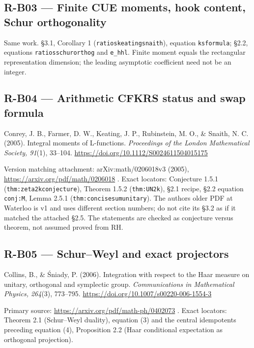\documentclass[11pt,a4paper]{article}
\theoremstyle{definition}\newtheorem{definition}{Definition}
\begin{document}
\subsection{R-B03 --- Finite CUE moments, hook content, Schur
orthogonality}\label{r-b03--finite-cue-moments-hook-content-schur-orthogonality}

Same work. §3.1, Corollary 1 (\texttt{ratioskeatingsnaith}), equation
\texttt{ksformula}; §2.2, equations \texttt{ratiosschurorthog} and
\texttt{e\_hhl}. Finite moment equals the rectangular representation
dimension; the leading asymptotic coefficient need not be an integer.

\subsection{R-B04 --- Arithmetic CFKRS status and swap
formula}\label{r-b04--arithmetic-cfkrs-status-and-swap-formula}

Conrey, J. B., Farmer, D. W., Keating, J. P., Rubinstein, M. O., \&
Snaith, N. C. (2005). Integral moments of L-functions. \emph{Proceedings
of the London Mathematical Society, 91}(1), 33--104.
\url{https://doi.org/10.1112/S0024611504015175}

Version matching attachment: arXiv:math/0206018v3 (2005),
\url{https://arxiv.org/pdf/math/0206018} . Exact locators: Conjecture
1.5.1 (\texttt{thm:zeta2kconjecture}), Theorem 1.5.2
(\texttt{thm:UN2k}), §2.1 recipe, §2.2 equation \texttt{conj:M}, Lemma
2.5.1 (\texttt{thm:concisesumunitary}). The author\textquotesingle s
older PDF at Waterloo is v1 and uses different section numbers; do not
cite its §3.2 as if it matched the attached §2.5. The statements are
checked as conjecture versus theorem, not assumed proved from RH.

\subsection{R-B05 --- Schur--Weyl and exact
projectors}\label{r-b05--schurweyl-and-exact-projectors}

Collins, B., \& Śniady, P. (2006). Integration with respect to the Haar
measure on unitary, orthogonal and symplectic group.
\emph{Communications in Mathematical Physics, 264}(3), 773--795.
\url{https://doi.org/10.1007/s00220-006-1554-3}

Primary source: \url{https://arxiv.org/pdf/math-ph/0402073} . Exact
locators: Theorem 2.1 (Schur--Weyl duality), equation (3) and the
central idempotents preceding equation (4), Proposition 2.2 (Haar
conditional expectation as orthogonal projection).
\end{document}
